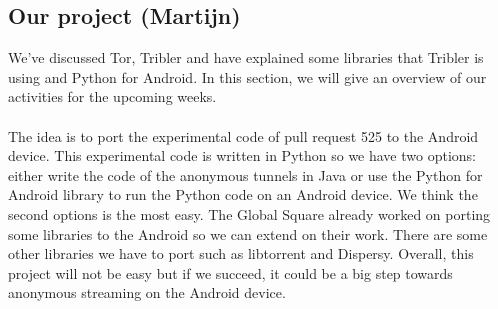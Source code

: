 \documentclass[11pt]{article}
\begin{document}
\subsection{Our project (Martijn)}
We've discussed Tor, Tribler and have explained some libraries that Tribler is using and Python for Android. In this section, we will give an overview of our activities for the upcoming weeks.\\\\
The idea is to port the experimental code of pull request 525 to the Android device. This experimental code is written in Python so we have two options: either write the code of the anonymous tunnels in Java or use the Python for Android library to run the Python code on an Android device. We think the second options is the most easy. The Global Square already worked on porting some libraries to the Android so we can extend on their work. There are some other libraries we have to port such as libtorrent and Dispersy. Overall, this project will not be easy but if we succeed, it could be a big step towards anonymous streaming on the Android device.



\end{document}
